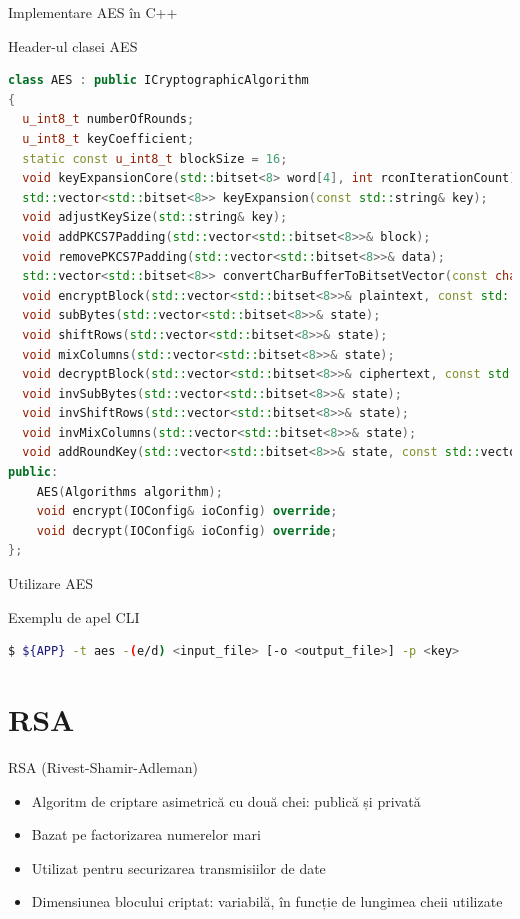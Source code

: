 \documentclass{beamer}
\begin{document}
\begin{frame}[fragile]{Implementare AES în C++}
  \begin{block}{Header-ul clasei AES}
    \begin{lstlisting}[language=C++]
class AES : public ICryptographicAlgorithm
{
  u_int8_t numberOfRounds;
  u_int8_t keyCoefficient;
  static const u_int8_t blockSize = 16;
  void keyExpansionCore(std::bitset<8> word[4], int rconIterationCount);
  std::vector<std::bitset<8>> keyExpansion(const std::string& key);
  void adjustKeySize(std::string& key);
  void addPKCS7Padding(std::vector<std::bitset<8>>& block);
  void removePKCS7Padding(std::vector<std::bitset<8>>& data);
  std::vector<std::bitset<8>> convertCharBufferToBitsetVector(const char* buffer, size_t length);
  void encryptBlock(std::vector<std::bitset<8>>& plaintext, const std::vector<std::bitset<8>>& expandedKeys);
  void subBytes(std::vector<std::bitset<8>>& state);
  void shiftRows(std::vector<std::bitset<8>>& state);
  void mixColumns(std::vector<std::bitset<8>>& state);
  void decryptBlock(std::vector<std::bitset<8>>& ciphertext, const std::vector<std::bitset<8>>& expandedKeys);
  void invSubBytes(std::vector<std::bitset<8>>& state);
  void invShiftRows(std::vector<std::bitset<8>>& state);
  void invMixColumns(std::vector<std::bitset<8>>& state);
  void addRoundKey(std::vector<std::bitset<8>>& state, const std::vector<std::bitset<8>>& roundKey);
public:
    AES(Algorithms algorithm);
    void encrypt(IOConfig& ioConfig) override;
    void decrypt(IOConfig& ioConfig) override;
};
    \end{lstlisting}
  \end{block}
\end{frame}

\begin{frame}[fragile]{Utilizare AES}
  \begin{block}{Exemplu de apel CLI}
    \begin{lstlisting}[language=bash]
$ ${APP} -t aes -(e/d) <input_file> [-o <output_file>] -p <key>
    \end{lstlisting}
  \end{block}
\end{frame}
\section{RSA}

\begin{frame}{RSA (Rivest-Shamir-Adleman)}
  \begin{itemize}
    \item Algoritm de criptare asimetrică cu două chei: publică și privată
    \item Bazat pe factorizarea numerelor mari
    \item Utilizat pentru securizarea transmisiilor de date
    \item Dimensiunea blocului criptat: variabilă, în funcție de lungimea cheii utilizate
  \end{itemize}
\end{frame}
\end{document}
